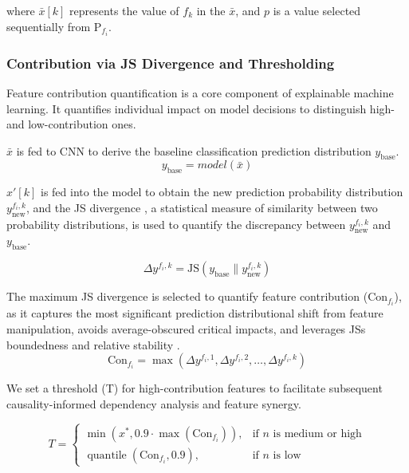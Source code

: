 \documentclass[journal]{IEEEtran}
\begin{document}
where \(\bar{x}[k]\) represents the value of $f_k$ in the $\bar{x}$, and $p$ is a value selected sequentially from \(\text{P}_{f_i}\).

\subsubsection{Contribution via JS Divergence and Thresholding}
\label{FeatureContributionQuantification}
Feature contribution quantification is a core component of explainable machine learning. It quantifies individual impact on model decisions to distinguish high- and low-contribution ones. 

\(\bar{x}\) is fed to CNN to derive the baseline classification prediction distribution \(y_{\text{base}}\).
\begin{equation}
\label{ybase}
    y_{\text{base}}=model(\bar{x})
\end{equation}

$x'[k]$ is fed into the model to obtain the new prediction probability distribution $y_{\text{new}}^{f_i,k}$, and the JS divergence \cite{fuglede2004jsd,jiang2024ultra}, a statistical measure of similarity between two probability distributions, is used to quantify the discrepancy between $y_{\text{new}}^{f_i,k}$ and $y_{\text{base}}$.

\begin{equation}
\Delta y^{{f_i},k}=\text{JS}({y_{\text{base}}} \parallel {y_{\text{new}}^{{f_i},k}})
\end{equation}

The maximum JS divergence is selected to quantify feature contribution ($\text{Con}_{f_i}$), as it captures the most significant prediction distributional shift from feature manipulation, avoids average-obscured critical impacts, and leverages JS\textquotesingle s boundedness and relative stability \cite{englesson2021jsd}.
\begin{equation}
\text{Con}_{f_i} = \max(\Delta y^{{f_i},1}, \Delta y^{{f_i},2}, \dots, \Delta y^{{f_i},k})
\end{equation}

We set a threshold (T) for high-contribution features to facilitate subsequent causality-informed dependency analysis and feature synergy.

\begin{equation}
T =
\begin{cases}
\min\left(x^{*},0.9 \cdot \max(\text{Con}_{f_i})\right), & \text{if } n \text{ is medium or high} \\
\operatorname{quantile}(\text{Con}_{f_i}, 0.9), & \text{if } n \text{ is low}
\end{cases}
\label{eq:threshold_T}
\end{equation}
\end{document}

